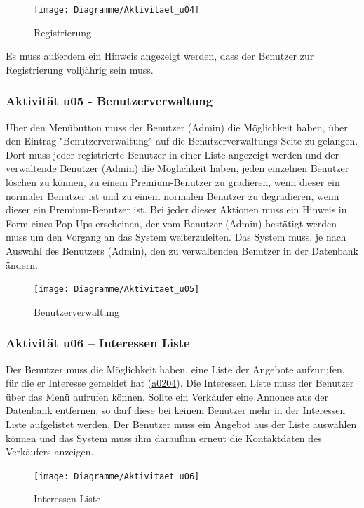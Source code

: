 \documentclass[a4paper,12pt,oneside]{scrartcl}
\begin{document}
\begin{figure}[!htbp]
\centering
\noindent\texttt{[image: Diagramme/Aktivitaet\_u04]}
\caption{Registrierung}
\end{figure}
\FloatBarrier
Es muss außerdem ein Hinweis angezeigt werden, dass der Benutzer zur Registrierung volljährig sein muss.



\subsubsection{Aktivität u05 - Benutzerverwaltung}
Über den Menübutton muss der Benutzer (Admin) die Möglichkeit haben, über den Eintrag "Benutzerverwaltung" auf die Benutzerverwaltungs-Seite zu gelangen. 
Dort muss jeder registrierte Benutzer in einer Liste angezeigt werden und der verwaltende Benutzer (Admin) die Möglichkeit haben, jeden einzelnen Benutzer löschen zu können, zu einem Premium-Benutzer zu gradieren, wenn dieser ein normaler Benutzer ist und zu einem normalen Benutzer zu degradieren, wenn dieser ein Premium-Benutzer ist. 
Bei jeder dieser Aktionen muss ein Hinweis in Form eines Pop-Ups erscheinen, der vom Benutzer (Admin) bestätigt werden muss um den Vorgang an das System weiterzuleiten. 
Das System muss, je nach Auswahl des Benutzers (Admin), den zu verwaltenden Benutzer in der Datenbank ändern.

\begin{figure}[!htbp]
\centering
\noindent\texttt{[image: Diagramme/Aktivitaet\_u05]}
\caption{Benutzerverwaltung}
\end{figure}
\FloatBarrier


\subsubsection{Aktivität u06 – Interessen Liste}
Der Benutzer muss die Möglichkeit haben, eine Liste der Angebote aufzurufen, für die er Interesse gemeldet hat (\hyperlink{u02}{a0204}).
Die Interessen Liste muss der Benutzer über das Menü aufrufen können. 
Sollte ein Verkäufer eine Annonce aus der Datenbank entfernen, so darf diese bei keinem Benutzer mehr in der Interessen Liste aufgelistet werden.
Der Benutzer muss ein Angebot aus der Liste auswählen können und das System muss ihm daraufhin erneut die Kontaktdaten des Verkäufers anzeigen.

\begin{figure}[!htbp]
\centering
\noindent\texttt{[image: Diagramme/Aktivitaet\_u06]}
\caption{Interessen Liste}
\end{figure}
\FloatBarrier
\end{document}
